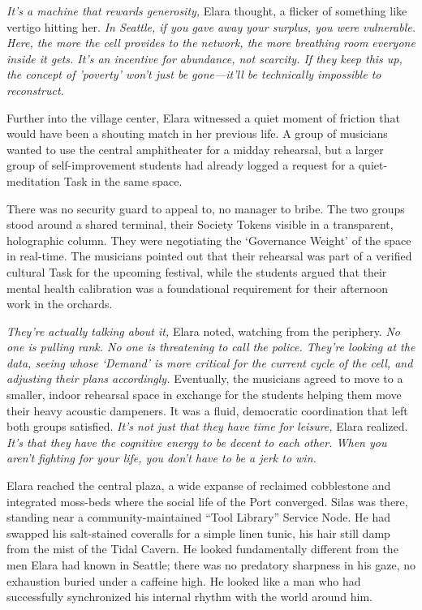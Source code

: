 \textit{It’s a machine that rewards generosity,} Elara thought, a flicker of something like vertigo hitting her. \textit{In Seattle, if you gave away your surplus, you were vulnerable. Here, the more the cell provides to the network, the more breathing room everyone inside it gets. It's an incentive for abundance, not scarcity. If they keep this up, the concept of 'poverty' won't just be gone—it'll be technically impossible to reconstruct.}


Further into the village center, Elara witnessed a quiet moment of friction that would have been a shouting match in her previous life. A group of musicians wanted to use the central amphitheater for a midday rehearsal, but a larger group of self-improvement students had already logged a request for a quiet-meditation Task in the same space.

There was no security guard to appeal to, no manager to bribe. The two groups stood around a shared terminal, their Society Tokens visible in a transparent, holographic column. They were negotiating the `Governance Weight' of the space in real-time. The musicians pointed out that their rehearsal was part of a verified cultural Task for the upcoming festival, while the students argued that their mental health calibration was a foundational requirement for their afternoon work in the orchards. 

\textit{They're actually talking about it,} Elara noted, watching from the periphery. \textit{No one is pulling rank. No one is threatening to call the police. They're looking at the data, seeing whose `Demand' is more critical for the current cycle of the cell, and adjusting their plans accordingly.} Eventually, the musicians agreed to move to a smaller, indoor rehearsal space in exchange for the students helping them move their heavy acoustic dampeners. It was a fluid, democratic coordination that left both groups satisfied. \textit{It's not just that they have time for leisure,} Elara realized. \textit{It's that they have the cognitive energy to be decent to each other. When you aren't fighting for your life, you don't have to be a jerk to win.}


Elara reached the central plaza, a wide expanse of reclaimed cobblestone and integrated moss-beds where the social life of the Port converged. Silas was there, standing near a community-maintained ``Tool Library'' Service Node. He had swapped his salt-stained coveralls for a simple linen tunic, his hair still damp from the mist of the Tidal Cavern. He looked fundamentally different from the men Elara had known in Seattle; there was no predatory sharpness in his gaze, no exhaustion buried under a caffeine high. He looked like a man who had successfully synchronized his internal rhythm with the world around him.

